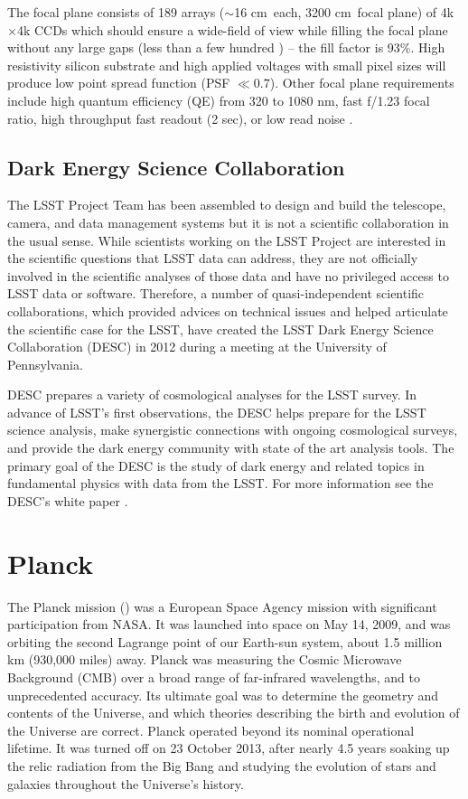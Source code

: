 The focal plane consists of 189 arrays ($\sim$16 cm\sq\ each, 3200 cm\sq\ focal plane) of 4k$\times$4k CCDs which should ensure a wide-field of view while filling the focal plane without any large gaps (less than a few hundred \um) -- the fill factor is 93\%. High resistivity silicon substrate and high applied voltages with small pixel sizes will produce low point spread function (PSF $\ll0.7$\arcsec). Other focal plane requirements include high quantum efficiency (QE) from 320 to 1080 nm, fast f/1.23 focal ratio, high throughput fast readout (2 sec), or low read noise \parencite{2017JInst..12C3017A}.


\subsection{Dark Energy Science Collaboration}
The LSST Project Team has been assembled to design and build the telescope, camera, and data management systems but it is not a scientific collaboration in the usual sense. While scientists working on the LSST Project are interested in the scientific questions that LSST data can address, they are not officially involved in the scientific analyses of those data and have no privileged access to LSST data or software. Therefore, a number of quasi-independent scientific collaborations, which provided advices on technical issues and helped articulate the scientific case for the LSST, have created the LSST Dark Energy Science Collaboration (DESC) in 2012 during a meeting at the University of Pennsylvania.

DESC prepares a variety of cosmological analyses for the LSST survey. In advance of LSST's first observations, the DESC helps prepare for the LSST science analysis, make synergistic connections with ongoing cosmological surveys, and provide the dark energy community with state of the art analysis tools. The primary goal of the DESC is the study of dark energy and related topics in fundamental physics with data from the LSST. For more information see the DESC's white paper \cite{desc_white}.

\section{Planck}
The Planck mission (\cite{planck}) was a European Space Agency mission with significant participation from NASA. It was launched into space on May 14, 2009, and was orbiting the second Lagrange point of our Earth-sun system, about 1.5 million km (930,000 miles) away. Planck was measuring the Cosmic Microwave Background (CMB) over a broad range of far-infrared wavelengths, and to unprecedented accuracy. Its ultimate goal was to determine the geometry and contents of the Universe, and which theories describing the birth and evolution of the Universe are correct. Planck operated beyond its nominal operational lifetime. It was turned off on 23 October 2013, after nearly 4.5 years soaking up the relic radiation from the Big Bang and studying the evolution of stars and galaxies throughout the Universe's history.

